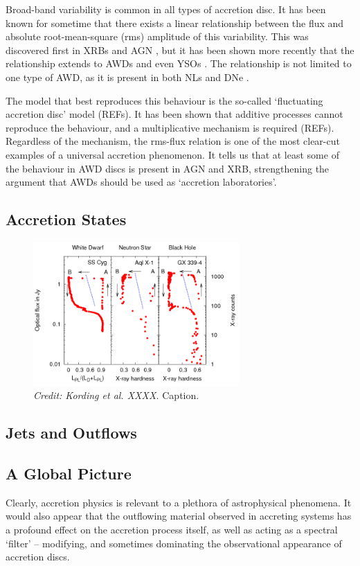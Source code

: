 Broad-band variability is common in all types of accretion disc. It has been
known for sometime that there exists a linear relationship
between the flux and absolute root-mean-square (rms) amplitude
of this variability. This was discovered first in XRBs and AGN 
\citep{uttley2001, uttley2005, heil2012}, but it has been shown
more recently that the relationship extends to AWDs and even YSOs 
\citep{scaringi2012,scaringi2015a}. The relationship is not limited
to one type of AWD, as it is present in both NLs and DNe \citep{vandesande2015}.
 
The model that best reproduces this behaviour is the so-called
`fluctuating accretion disc' model (REFs). It has been shown that 
additive processes cannot reproduce the behaviour, and a multiplicative
mechanism is required (REFs). 
Regardless of the mechanism, the rms-flux relation is one of the most
clear-cut examples of a universal accretion phenomenon. 
It tells us that at least some of the behaviour in AWD discs
is present in AGN and XRB, strengthening the argument that AWDs
should be used as `accretion laboratories'. 


\subsection{Accretion States}


\begin{figure}
\centering
\includegraphics[width=0.7\textwidth]{figures/02-accretion/kording_hid.png}
\caption
{
{\sl Credit: Kording et al. XXXX.} 
Caption.
} 
\label{fig:kording_hid}
\end{figure}



\subsection{Jets and Outflows}


\subsection{A Global Picture}

Clearly, accretion physics is relevant to a plethora of astrophysical phenomena. 
It would also appear that the outflowing material observed in accreting systems 
has a profound effect on the accretion process itself, as well as acting 
as a spectral `filter' -- modifying, and sometimes dominating the observational 
appearance of accretion discs.

